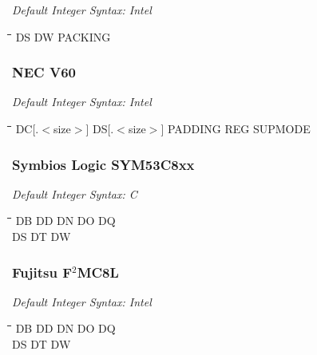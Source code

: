 {\em Default Integer Syntax: Intel}

{\tt\begin{tabbing} 
\hspace{3cm}\=\hspace{3cm}\=\hspace{3cm}\=\hspace{3cm}\=\kill
DS         \> DW          \> PACKING \\
\end{tabbing}}

\subsubsection{NEC V60}

{\em Default Integer Syntax: Intel}

{\tt\begin{tabbing}
\hspace{3cm}\=\hspace{3cm}\=\hspace{3cm}\=\hspace{3cm}\=\kill
DC[.$<$size$>$]\> DS[.$<$size$>$] \> PADDING \> REG         \> SUPMODE \\
\end{tabbing}}

\subsubsection{Symbios Logic SYM53C8xx}

{\em Default Integer Syntax: C}

{\tt\begin{tabbing} 
\hspace{3cm}\=\hspace{3cm}\=\hspace{3cm}\=\hspace{3cm}\=\kill
DB         \> DD          \> DN          \> DO          \> DQ \\
DS         \> DT          \> DW \\
\end{tabbing}}

\subsubsection{Fujitsu F$^{2}$MC8L}

{\em Default Integer Syntax: Intel}

{\tt\begin{tabbing} 
\hspace{3cm}\=\hspace{3cm}\=\hspace{3cm}\=\hspace{3cm}\=\kill
DB         \> DD          \> DN          \> DO         \> DQ \\
DS         \> DT          \> DW \\
\end{tabbing}}

